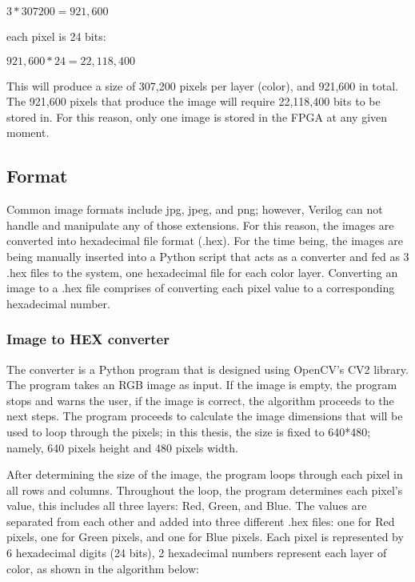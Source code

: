 \begin{math}
    3 * 307200 = 921,600            
\end{math}

\par each pixel is 24 bits: \newline

\begin{math}
    921,600 * 24 = 22,118,400       
\end{math}
\newline

\par This will produce a size of 307,200 pixels per layer (color), and 921,600 in total. The 921,600 pixels that produce the image will require 22,118,400 bits to be stored in. For this reason, only one image is stored in the FPGA at any given moment.  \newline

\subsection{Format}
\par Common image formats include jpg, jpeg, and png; however, Verilog can not handle and manipulate any of those extensions. For this reason, the images are converted into hexadecimal file format (.hex). For the time being, the images are being manually inserted into a Python script that acts as a converter and fed as 3 .hex files to the system, one hexadecimal file for each color layer. Converting an image to a .hex file comprises of converting each pixel value to a corresponding hexadecimal number.\newline

\subsubsection{Image to HEX converter}
\par The converter is a Python program that is designed using OpenCV's CV2 library. The program takes an RGB image as input. If the image is empty, the program stops and warns the user, if the image is correct, the algorithm proceeds to the next steps. The program proceeds to calculate the image dimensions that will be used to loop through the pixels; in this thesis, the size is fixed to 640*480; namely, 640 pixels height and 480 pixels width. \newline
\par After determining the size of the image, the program loops through each pixel in all rows and columns. Throughout the loop, the program determines each pixel's value, this includes all three layers: Red, Green, and Blue. The values are separated from each other and added into three different .hex files: one for Red pixels, one for Green pixels, and one for Blue pixels. Each pixel is represented by 6 hexadecimal digits (24 bits), 2 hexadecimal numbers represent each layer of color, as shown in the algorithm below: \newline

